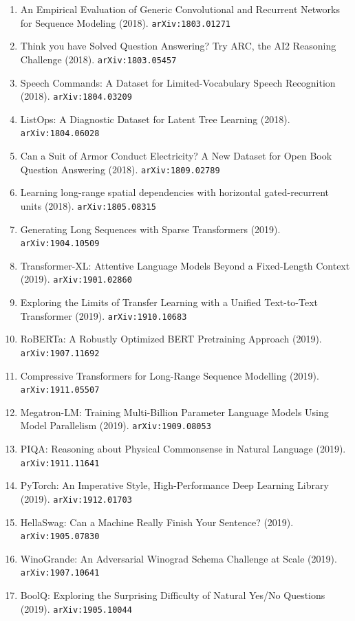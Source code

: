 \documentclass[11pt]{article}
\begin{document}
\begin{enumerate}
  Understanding (2018). \texttt{arXiv:1804.07461}
  \item An Empirical Evaluation of Generic Convolutional and Recurrent Networks
  for Sequence Modeling (2018). \texttt{arXiv:1803.01271}
  \item Think you have Solved Question Answering? Try ARC, the AI2 Reasoning
  Challenge (2018). \texttt{arXiv:1803.05457}
  \item Speech Commands: A Dataset for Limited-Vocabulary Speech Recognition (2018). \texttt{arXiv:1804.03209}
  \item ListOps: A Diagnostic Dataset for Latent Tree Learning (2018). \texttt{arXiv:1804.06028}
  \item Can a Suit of Armor Conduct Electricity? A New Dataset for Open Book
  Question Answering (2018). \texttt{arXiv:1809.02789}
  \item Learning long-range spatial dependencies with horizontal gated-recurrent
  units (2018). \texttt{arXiv:1805.08315}
  \item Generating Long Sequences with Sparse Transformers (2019). \texttt{arXiv:1904.10509}
  \item Transformer-XL: Attentive Language Models Beyond a Fixed-Length Context (2019). \texttt{arXiv:1901.02860}
  \item Exploring the Limits of Transfer Learning with a Unified Text-to-Text
  Transformer (2019). \texttt{arXiv:1910.10683}
  \item RoBERTa: A Robustly Optimized BERT Pretraining Approach (2019). \texttt{arXiv:1907.11692}
  \item Compressive Transformers for Long-Range Sequence Modelling (2019). \texttt{arXiv:1911.05507}
  \item Megatron-LM: Training Multi-Billion Parameter Language Models Using
  Model Parallelism (2019). \texttt{arXiv:1909.08053}
  \item PIQA: Reasoning about Physical Commonsense in Natural Language (2019). \texttt{arXiv:1911.11641}
  \item PyTorch: An Imperative Style, High-Performance Deep Learning Library (2019). \texttt{arXiv:1912.01703}
  \item HellaSwag: Can a Machine Really Finish Your Sentence? (2019). \texttt{arXiv:1905.07830}
  \item WinoGrande: An Adversarial Winograd Schema Challenge at Scale (2019). \texttt{arXiv:1907.10641}
  \item BoolQ: Exploring the Surprising Difficulty of Natural Yes/No Questions (2019). \texttt{arXiv:1905.10044}

\end{enumerate}
\end{document}
